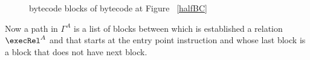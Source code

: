 \begin{figure}[p]
\begin{center}
\end{center}
\caption{bytecode blocks of bytecode at Figure ~\ref{halfBC}}
\label{blockBC}
\end{figure}

Now a path in $\Gamma^A$  is a list of blocks between which is established a relation $\execRel^A$ and that starts at the entry point instruction and whose last block is a block that does not have next block.

